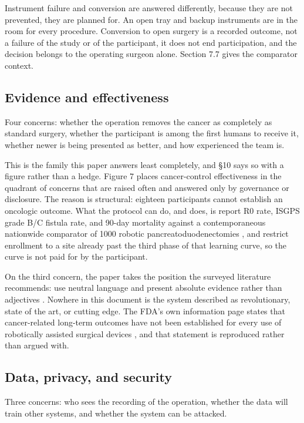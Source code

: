 Instrument failure and conversion are answered differently, because they are not
prevented, they are planned for. An open tray and backup instruments are in the
room for every procedure. Conversion to open surgery is a recorded outcome, not
a failure of the study or of the participant, it does not end participation, and
the decision belongs to the operating surgeon alone. Section 7.7 gives the
comparator context.

\subsection{Evidence and effectiveness}

Four concerns: whether the operation removes the cancer as completely as
standard surgery, whether the participant is among the first humans to receive
it, whether newer is being presented as better, and how experienced the team is.

This is the family this paper answers least completely, and \S10 says so with a
figure rather than a hedge. Figure 7 places cancer-control effectiveness in the
quadrant of concerns that are raised often and answered only by governance or
disclosure. The reason is structural: eighteen participants cannot establish an
oncologic outcome. What the protocol can do, and does, is report R0 rate, ISGPS
grade B/C fistula rate, and 90-day mortality against a contemporaneous
nationwide comparator of 1000 robotic pancreatoduodenectomies
\cite{DutchCohort2025}, and restrict enrollment to a site already past the third
phase of that learning curve, so the curve is not paid for by the participant.

On the third concern, the paper takes the position the surveyed literature
recommends: use neutral language and present absolute evidence rather than
adjectives \cite{Jauniaux2025}. Nowhere in this document is the system described
as revolutionary, state of the art, or cutting edge. The FDA's own information
page states that cancer-related long-term outcomes have not been established for
every use of robotically assisted surgical devices \cite{FDARobot2022}, and that
statement is reproduced rather than argued with.

\subsection{Data, privacy, and security}

Three concerns: who sees the recording of the operation, whether the data will
train other systems, and whether the system can be attacked.


